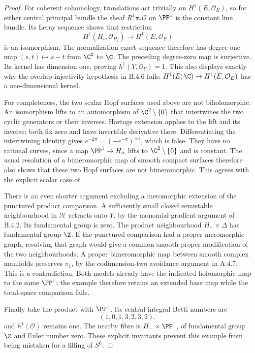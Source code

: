 \begin{proof}
For coherent cohomology, translations act trivially on
$H^1(E,\mathcal O_E)$, so for either central principal bundle
the sheaf $R^1\pi_*\mathcal O$ on $\PP^1$ is the constant
line bundle.  Its Leray sequence shows that restriction
\[
 H^1(H_i,\mathcal O_{H_i})\longrightarrow H^1(E,\mathcal O_E)
\]
is an isomorphism.  The normalization exact sequence therefore
has degree-one map $(s,t)\mapsto s-t$ from $\C^2$ to $\C$.
The preceding degree-zero map is surjective.  Its kernel has
dimension one, proving $h^1(Y,\mathcal O_Y)=1$.
This also displays exactly why the overlap-injectivity hypothesis
in B.4.6 fails: $H^1(E;\C)\to H^1(E,\mathcal O_E)$ has a
one-dimensional kernel.

For completeness, the two scalar Hopf surfaces used above are
not biholomorphic.  An isomorphism lifts to an automorphism of
$\C^2\setminus\{0\}$ that intertwines the two cyclic generators
or their inverses.  Hartogs extension applies to the lift and
its inverse; both fix zero and have invertible derivative there.
Differentiating the intertwining identity gives
$e^{-2\pi}=(-e^{-\pi})^{\pm1}$, which is false.  They have
no rational curves, since a map $\PP^1\to H_\alpha$ lifts to
$\C^2\setminus\{0\}$ and is constant.  The usual resolution
of a bimeromorphic map of smooth compact surfaces therefore
also shows that these two Hopf surfaces are not bimeromorphic.
This agrees with the explicit scalar case of
\citet[Section 2.2]{AbashevaDeev2024AB}.

There is an even shorter argument excluding a meromorphic
extension of the punctured product comparison.  A sufficiently
small closed semistable neighbourhood in $\mathcal H$ retracts
onto $Y$, by the monomial-gradient argument of B.4.2.  Its
fundamental group is zero.  The product neighbourhood
$H_-\times\Delta$ has fundamental group $\Z$.  If the
punctured comparison had a proper meromorphic graph, resolving
that graph would give a common smooth proper modification of
the two neighbourhoods.  A proper bimeromorphic map between
smooth complex manifolds preserves $\pi_1$, by the
codimension-two avoidance argument in A.4.7.  This is a
contradiction.  Both models already have the indicated
holomorphic map to the same $\PP^1$; the example therefore
retains an extended base map while the total-space comparison
fails.

Finally take the product with $\PP^1$.  Its central integral
Betti numbers are
\[
 (1,0,1,3,2,3,2),
\]
and $h^1(\mathcal O)$ remains one.  The nearby fibre is
$H_-\times\PP^1$, of fundamental group $\Z$ and Euler
number zero.  These explicit invariants prevent this example
from being mistaken for a filling of $S^6$.
\end{proof}

